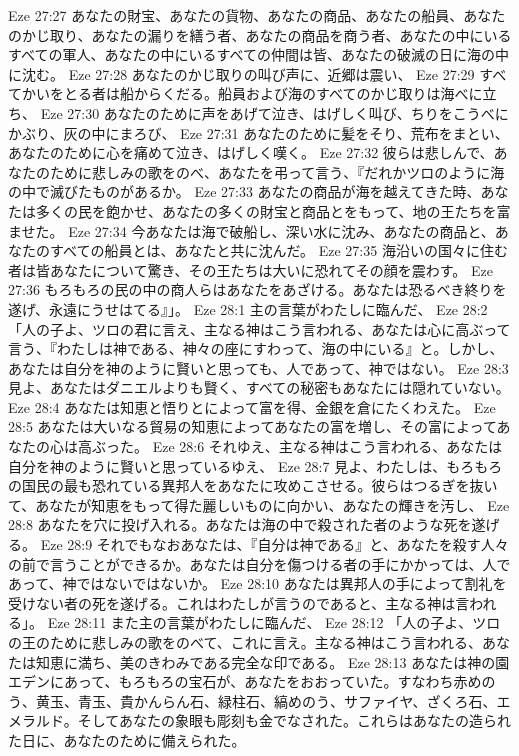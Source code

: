 Eze 27:27  あなたの財宝、あなたの貨物、あなたの商品、あなたの船員、あなたのかじ取り、あなたの漏りを繕う者、あなたの商品を商う者、あなたの中にいるすべての軍人、あなたの中にいるすべての仲間は皆、あなたの破滅の日に海の中に沈む。
Eze 27:28  あなたのかじ取りの叫び声に、近郷は震い、
Eze 27:29  すべてかいをとる者は船からくだる。船員および海のすべてのかじ取りは海べに立ち、
Eze 27:30  あなたのために声をあげて泣き、はげしく叫び、ちりをこうべにかぶり、灰の中にまろび、
Eze 27:31  あなたのために髪をそり、荒布をまとい、あなたのために心を痛めて泣き、はげしく嘆く。
Eze 27:32  彼らは悲しんで、あなたのために悲しみの歌をのべ、あなたを弔って言う、『だれかツロのように海の中で滅びたものがあるか。
Eze 27:33  あなたの商品が海を越えてきた時、あなたは多くの民を飽かせ、あなたの多くの財宝と商品とをもって、地の王たちを富ませた。
Eze 27:34  今あなたは海で破船し、深い水に沈み、あなたの商品と、あなたのすべての船員とは、あなたと共に沈んだ。
Eze 27:35  海沿いの国々に住む者は皆あなたについて驚き、その王たちは大いに恐れてその顔を震わす。
Eze 27:36  もろもろの民の中の商人らはあなたをあざける。あなたは恐るべき終りを遂げ、永遠にうせはてる』」。
Eze 28:1  主の言葉がわたしに臨んだ、
Eze 28:2  「人の子よ、ツロの君に言え、主なる神はこう言われる、あなたは心に高ぶって言う、『わたしは神である、神々の座にすわって、海の中にいる』と。しかし、あなたは自分を神のように賢いと思っても、人であって、神ではない。
Eze 28:3  見よ、あなたはダニエルよりも賢く、すべての秘密もあなたには隠れていない。
Eze 28:4  あなたは知恵と悟りとによって富を得、金銀を倉にたくわえた。
Eze 28:5  あなたは大いなる貿易の知恵によってあなたの富を増し、その富によってあなたの心は高ぶった。
Eze 28:6  それゆえ、主なる神はこう言われる、あなたは自分を神のように賢いと思っているゆえ、
Eze 28:7  見よ、わたしは、もろもろの国民の最も恐れている異邦人をあなたに攻めこさせる。彼らはつるぎを抜いて、あなたが知恵をもって得た麗しいものに向かい、あなたの輝きを汚し、
Eze 28:8  あなたを穴に投げ入れる。あなたは海の中で殺された者のような死を遂げる。
Eze 28:9  それでもなおあなたは、『自分は神である』と、あなたを殺す人々の前で言うことができるか。あなたは自分を傷つける者の手にかかっては、人であって、神ではないではないか。
Eze 28:10  あなたは異邦人の手によって割礼を受けない者の死を遂げる。これはわたしが言うのであると、主なる神は言われる」。
Eze 28:11  また主の言葉がわたしに臨んだ、
Eze 28:12  「人の子よ、ツロの王のために悲しみの歌をのべて、これに言え。主なる神はこう言われる、あなたは知恵に満ち、美のきわみである完全な印である。
Eze 28:13  あなたは神の園エデンにあって、もろもろの宝石が、あなたをおおっていた。すなわち赤めのう、黄玉、青玉、貴かんらん石、緑柱石、縞めのう、サファイヤ、ざくろ石、エメラルド。そしてあなたの象眼も彫刻も金でなされた。これらはあなたの造られた日に、あなたのために備えられた。
